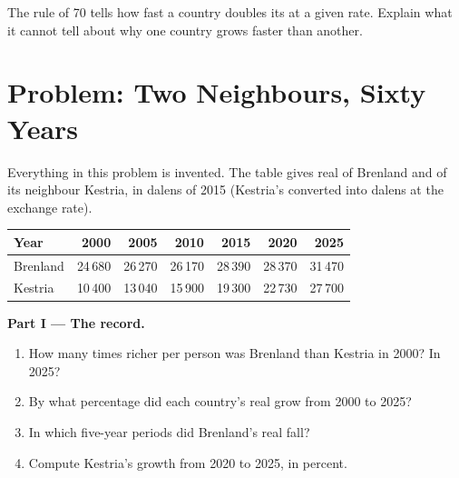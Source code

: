 \begin{exercise}[$\star\star\star$]\label{exo:g8:growth-and-compounding:12}
The rule of 70 tells how fast a country doubles its  at a given rate. Explain what it cannot
tell about why one country grows faster than another.
\end{exercise}

\section{Problem: Two Neighbours, Sixty Years}

\begin{problem}
\label{pb:g8:growth-and-compounding:1}
Everything in this problem is invented. The table gives real  of Brenland and of its
neighbour Kestria, in dalens of 2015 (Kestria's converted into dalens at the  exchange rate).
\begin{center}
\begin{tabular}{lrrrrrr}
\toprule
Year & 2000 & 2005 & 2010 & 2015 & 2020 & 2025 \\
\midrule
Brenland & 24\,680 & 26\,270 & 26\,170 & 28\,390 & 28\,370 & 31\,470 \\
Kestria & 10\,400 & 13\,040 & 15\,900 & 19\,300 & 22\,730 & 27\,700 \\
\bottomrule
\end{tabular}
\end{center}

\medskip
\noindent\textbf{Part I --- The record.}
\begin{enumerate}
  \item How many times richer per person was Brenland than Kestria in 2000? In 2025?
  \item By what percentage did each country's real  grow from 2000 to 2025?
  \item In which five-year periods did Brenland's real  fall?
  \item Compute Kestria's growth from 2020 to 2025, in percent.
\end{enumerate}


\end{problem}

